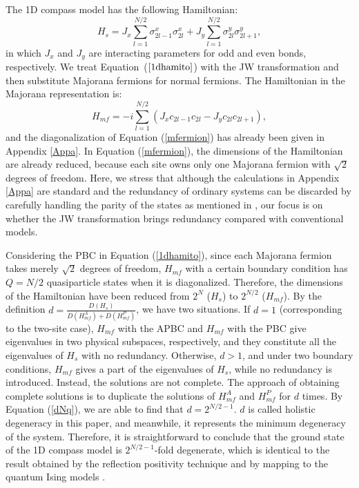 \documentclass[twocolumn,floats,superscriptaddress]{revtex4}
\begin{document}
The 1D compass model has the following Hamiltonian:
\begin{equation}\label{1dhamito}
H_s=J_x\sum_{l=1}^{N/2}{\sigma^x_{2l-1}\sigma^x_{2l}}+J_y\sum_{l=1}^{N/2}{\sigma^y_{2l}\sigma^y_{2l+1}},
\end{equation}
in which $J_x$ and $J_y$ are interacting parameters for odd and even bonds, respectively. We treat Equation~($\ref{1dhamito}$) with the JW transformation and then substitute Majorana fermions for normal fermions. The Hamiltonian in the Majorana representation is:
\begin{equation}\label{mfermion}
H_{mf}=-i\sum_{l=1}^{N/2}{(J_x c_{2l-1}c_{2l}-J_yc_{2l}c_{2l+1})}, %
\end{equation}
and the diagonalization of Equation (\ref{mfermion}) has already been given in Appendix \ref{Appa}. {In Equation (\ref{mfermion}), the dimensions of the Hamiltonian are already reduced, because each site owns only one Majorana fermion with $\sqrt{2}$ degrees of freedom.} Here, we stress that although the calculations in Appendix \ref{Appa} are standard and the redundancy {of ordinary systems} can be discarded by carefully handling the parity of the states as mentioned in \cite{Lieb1961}, our focus is {on} whether the JW transformation brings redundancy compared {with} conventional models.

Considering the PBC in Equation (\ref{1dhamito}), since each Majorana fermion takes merely $\sqrt{2}$ degrees of freedom, $H_{mf}$ with a certain boundary condition has $Q=N/2$ quasiparticle states when it is diagonalized. Therefore, the dimensions of the Hamiltonian have been reduced from $2^N$ ($H_s$) to $2^{N/2}$ ($H_{mf}$). By the definition $d=\frac{D(H_{s})}{D(H_{mf}^A)+D(H_{mf}^P)}$, we have two situations. If $d=1$ (corresponding to the two-site case), $H_{mf}$ with the APBC and {$H_{mf}$ with} the PBC {give} eigenvalues in two physical subspaces, respectively, and they constitute all the eigenvalues of $H_s$ with no redundancy. Otherwise, $d>1$, and {under two boundary conditions}, $H_{mf}$ gives a part of the eigenvalues of $H_s$, while no redundancy is {introduced. Instead,} the solutions are not complete. The approach of obtaining complete solutions is to duplicate the solutions of $H_{mf}^A$ and $H_{mf}^P$ for $d$ times. By Equation (\ref{dNq}), we are able to find that $d=2^{N/2-1}$. $d$ is called {holistic degeneracy} in this paper, and {meanwhile,} it represents the {minimum} degeneracy of the system.
 {Therefore, it is straightforward to conclude that the ground state of the 1D compass model is $2^{N/2-1}$-fold degenerate, which is identical to the result obtained by the reflection positivity technique \cite{You2008} and by mapping to the quantum Ising models \cite{Brzezicki2009}.}
\end{document}
